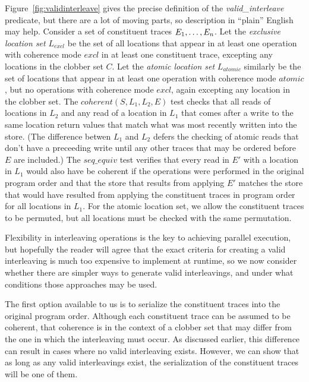 Figure~\ref{fig:validinterleave} gives the precise definition of the {\em valid\_interleave}
predicate, but there are a lot of moving parts, so description in ``plain'' English may help.
Consider a set of constituent traces ${E}_1,\ldots,{E}_n$.  Let the {\em exclusive location set} $L_{excl}$ be
the set of all locations that appear in at least one operation with coherence mode $excl$ in at least
one constituent trace, excepting any locations in the clobber set $C$.  Let the {\em atomic location
set} $L_{atomic}$ similarly be the set of locations that appear in at least one operation with 
coherence mode $atomic$, but no operations with coherence mode $excl$, again excepting any location
in the clobber set.  The $coherent(S,L_1,L_2,E)$ test checks that all reads of locations in $L_2$ and any read of a location in $L_1$ that comes after a write to the same location return values
that match what was most recently written into the store.  (The difference betwen $L_1$ and $L_2$
defers the checking of atomic reads that don't have a preceeding write until any other traces that
may be ordered before $E$ are included.)  The $seq\_equiv$ test verifies that every read in $E'$ with a location in $L_1$ would also have be coherent if the operations were performed in the original program order and that the store that results from applying $E'$ matches the store that would
have resulted from applying the constituent traces in program order for all locations in $L_1$.
For the atomic location set, we allow the constituent traces to be permuted, but all locations
must be checked with the same permutation.

Flexibility in interleaving operations is the key to achieving parallel execution, but
hopefully the reader will agree that the exact criteria for creating a valid interleaving is
much too expensive to implement at runtime, so we now consider whether there are simpler ways to
generate valid interleavings, and under what conditions those approaches may be used.

The first option available to us is to serialize the constituent traces into the original
program order.  Although each constituent trace can be assumed to be coherent, that coherence is
in the context of a clobber set that may differ from the one in which the interleaving must occur.
As discussed earlier, this difference can result in cases where no valid interleaving exists.
However, we can show that as long as any valid interleavings exist, the serialization of the
constituent traces will be one of them.

